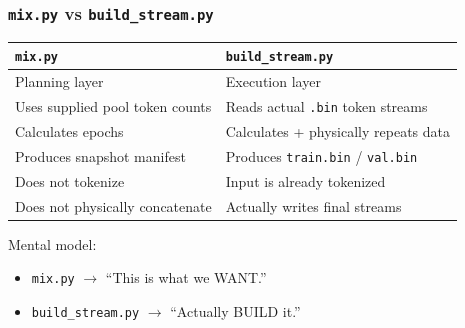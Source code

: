 \subsubsection{\texttt{mix.py} vs \texttt{build\_stream.py}}

\begin{center}
  \renewcommand{\arraystretch}{1.15}
  \small
  \begin{tabular}{@{}p{}p{}@{}}
    \textbf{\texttt{mix.py}} &
    \textbf{\texttt{build\_stream.py}} \\
    \hline
    Planning layer &
    Execution layer \\
    Uses supplied pool token counts &
    Reads actual \texttt{.bin} token streams \\
    Calculates epochs &
    Calculates + physically repeats data \\
    Produces snapshot manifest &
    Produces \texttt{train.bin} / \texttt{val.bin} \\
    Does not tokenize &
    Input is already tokenized \\
    Does not physically concatenate &
    Actually writes final streams
  \end{tabular}
\end{center}

Mental model:
\begin{itemize}
    \setlength{\itemsep}{0pt}
  \item \texttt{mix.py} $\rightarrow$ ``This is what we WANT.''
  \item \texttt{build\_stream.py} $\rightarrow$ ``Actually BUILD it.''
\end{itemize}


